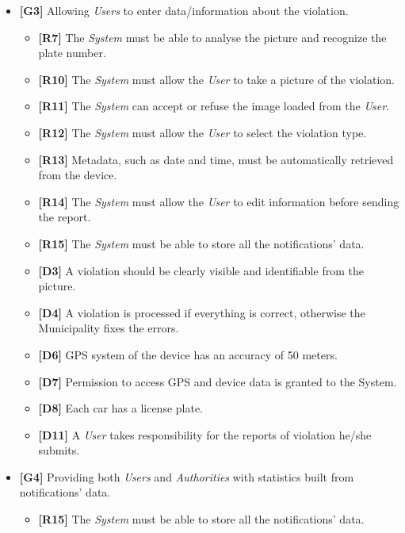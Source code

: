 \documentclass {article}
\begin{document}
\begin{itemize}
\begin{itemize}
   			 \item {\bf [D8]} Each car has a license plate.
   			 \item {\bf [D11]} A {\it User} takes responsibility for the reports of violation he/she submits.
			 \end{itemize}
			 \item {\bf [G3]} Allowing {\it Users} to enter data/information about the violation.
			 \begin{itemize}
			 \item {\bf [R7]} The {\it System} must be able to analyse the picture and recognize the plate number. 
			 \item {\bf [R10]} The {\it System} must allow the {\it User} to take a picture of the violation.
			 \item {\bf [R11]} The {\it System} can accept or refuse the image loaded from the {\it User}.
			 \item {\bf [R12]} The {\it System} must allow the {\it User} to select the violation type.
			 \item {\bf [R13]} Metadata, such as date and time, must be automatically retrieved from the device. 
			 \item {\bf [R14]} The {\it System} must allow the {\it User} to edit information before sending the report.
			 \item {\bf [R15]} The {\it System} must be able to store all the notifications' data.
			 \item {\bf [D3]} A violation should be clearly visible and identifiable from the picture.
			 \item {\bf [D4]} A violation is processed if everything is correct, otherwise the Municipality fixes the errors.
			 \item {\bf [D6]} GPS system of the device has an accuracy of 50 meters.
			 \item {\bf [D7]} Permission to access GPS and device data is granted to the System.
   			 \item {\bf [D8]} Each car has a license plate.
   			 \item {\bf [D11]} A {\it User} takes responsibility for the reports of violation he/she submits.
			 \end{itemize}
   			 \item {\bf [G4]} Providing both {\it Users} and {\it Authorities} with statistics built from notifications’ data.    	
   			 \begin{itemize}
   			 \item {\bf [R15]} The {\it System} must be able to store all the notifications' data.

\end{itemize}
\end{itemize}
\end{document}
